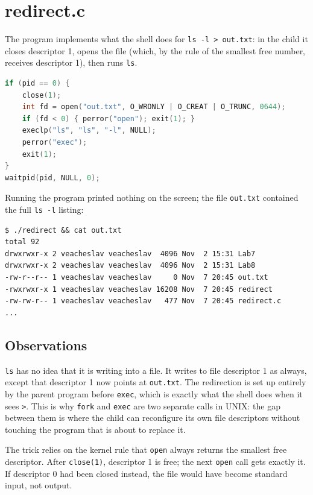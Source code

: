\documentclass[12pt,a4paper]{article}
\begin{document}
\section{redirect.c}

The program implements what the shell does for \texttt{ls -l > out.txt}: in the child it closes descriptor 1, opens the file (which, by the rule of the smallest free number, receives descriptor 1), then runs \texttt{ls}.

\begin{lstlisting}[language=C]
if (pid == 0) {
    close(1);
    int fd = open("out.txt", O_WRONLY | O_CREAT | O_TRUNC, 0644);
    if (fd < 0) { perror("open"); exit(1); }
    execlp("ls", "ls", "-l", NULL);
    perror("exec");
    exit(1);
}
waitpid(pid, NULL, 0);
\end{lstlisting}

Running the program printed nothing on the screen; the file \texttt{out.txt} contained the full \texttt{ls -l} listing:

\begin{lstlisting}
$ ./redirect && cat out.txt
total 92
drwxrwxr-x 2 veacheslav veacheslav  4096 Nov  2 15:31 Lab7
drwxrwxr-x 2 veacheslav veacheslav  4096 Nov  2 15:31 Lab8
-rw-r--r-- 1 veacheslav veacheslav     0 Nov  7 20:45 out.txt
-rwxrwxr-x 1 veacheslav veacheslav 16208 Nov  7 20:45 redirect
-rw-rw-r-- 1 veacheslav veacheslav   477 Nov  7 20:45 redirect.c
...
\end{lstlisting}

\subsection{Observations}

\texttt{ls} has no idea that it is writing into a file. It writes to file descriptor 1 as always, except that descriptor 1 now points at \texttt{out.txt}. The redirection is set up entirely by the parent program before \texttt{exec}, which is exactly what the shell does when it sees \texttt{>}. This is why \texttt{fork} and \texttt{exec} are two separate calls in UNIX: the gap between them is where the child can reconfigure its own file descriptors without touching the program that is about to replace it.

The trick relies on the kernel rule that \texttt{open} always returns the smallest free descriptor. After \texttt{close(1)}, descriptor 1 is free; the next \texttt{open} call gets exactly it. If descriptor 0 had been closed instead, the file would have become standard input, not output.
\end{document}

